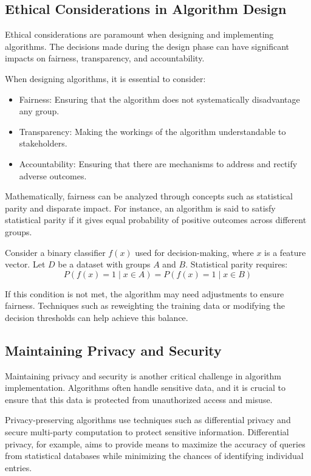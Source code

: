 \documentclass[12pt]{book} %
\begin{document}
\subsection{Ethical Considerations in Algorithm Design}
Ethical considerations are paramount when designing and implementing algorithms. The decisions made during the design phase can have significant impacts on fairness, transparency, and accountability.

When designing algorithms, it is essential to consider:
\begin{itemize}
    \item Fairness: Ensuring that the algorithm does not systematically disadvantage any group.
    \item Transparency: Making the workings of the algorithm understandable to stakeholders.
    \item Accountability: Ensuring that there are mechanisms to address and rectify adverse outcomes.
\end{itemize}

Mathematically, fairness can be analyzed through concepts such as statistical parity and disparate impact. For instance, an algorithm is said to satisfy statistical parity if it gives equal probability of positive outcomes across different groups.

Consider a binary classifier $f(x)$ used for decision-making, where $x$ is a feature vector. Let $D$ be a dataset with groups $A$ and $B$. Statistical parity requires:
\[ P(f(x) = 1 \mid x \in A) = P(f(x) = 1 \mid x \in B) \]

If this condition is not met, the algorithm may need adjustments to ensure fairness. Techniques such as reweighting the training data or modifying the decision thresholds can help achieve this balance.

\subsection{Maintaining Privacy and Security}
Maintaining privacy and security is another critical challenge in algorithm implementation. Algorithms often handle sensitive data, and it is crucial to ensure that this data is protected from unauthorized access and misuse.

Privacy-preserving algorithms use techniques such as differential privacy and secure multi-party computation to protect sensitive information. Differential privacy, for example, aims to provide means to maximize the accuracy of queries from statistical databases while minimizing the chances of identifying individual entries.
\end{document}
